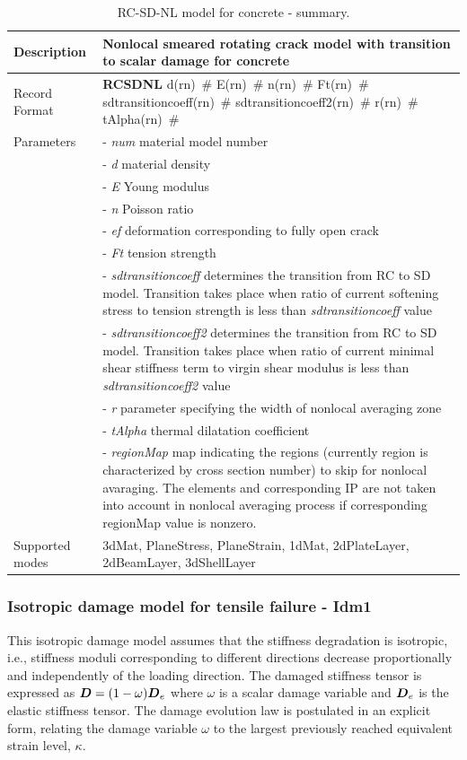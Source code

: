 \documentclass[a4paper]{article}
\newcommand{\mbf}[1]{\mbox{\boldmath$#1$}}
\newcommand{\descitem}[1]{{\noindent \bf #1}}
\newcommand{\elemparam}[2]{{{#1\tiny (#2)}~\#}}
\newcommand{\param}[1]{{\it #1}}
\begin{document}
\begin{table}[!htb]
\begin{tabular}{|l|p{9cm}|}
\hline
Description & Nonlocal smeared rotating crack model with transition to scalar damage for concrete\\
\hline
Record Format & \descitem{RCSDNL} \elemparam{d}{rn} \elemparam{E}{rn}
\elemparam{n}{rn}  \elemparam{Ft}{rn}
\elemparam{sdtransitioncoeff}{rn} \elemparam{sdtransitioncoeff2}{rn}
\elemparam{r}{rn} \elemparam{tAlpha}{rn} \\
Parameters &- \param{num} material model number\\
&- \param{d} material density\\
&- \param{E} Young modulus\\
&- \param{n} Poisson ratio\\
&- \param{ef} deformation corresponding to fully open crack\\
&- \param{Ft} tension strength\\
&- \param{sdtransitioncoeff} determines the transition from RC to SD
model. Transition takes place when ratio of current softening
stress to tension strength is less than  \param{sdtransitioncoeff} value\\
&- \param{sdtransitioncoeff2} determines the transition from RC to SD
model. Transition takes place when ratio of current minimal shear
stiffness term to virgin shear modulus is less than  \param{sdtransitioncoeff2} value\\
&- \param{r} parameter specifying the width of nonlocal averaging zone\\
&- \param{tAlpha} thermal dilatation coefficient\\
&- \param{regionMap} map indicating the regions (currently region is
characterized by cross section number) to skip for nonlocal
avaraging. The elements and corresponding IP are not taken into
account in nonlocal averaging process if corresponding regionMap
value is nonzero.\\
Supported modes& 3dMat, PlaneStress, PlaneStrain, 1dMat,
2dPlateLayer, 2dBeamLayer, 3dShellLayer\\
\hline
\end{tabular}
\caption{RC-SD-NL model for  concrete - summary.}
\label{rcsdnl_table}
\end{table}



\subsubsection{Isotropic damage model for tensile failure - Idm1}
\label{sec:idmtf}
This isotropic damage model assumes that the stiffness degradation is
isotropic, i.e., stiffness moduli corresponding to different
directions decrease proportionally and independently of the loading 
direction. The damaged stiffness tensor is expressed as
$\mbf{D}=(1-\omega)\mbf{D}_e$ where $\omega$ is a scalar damage variable
and $\mbf{D}_e$ is the elastic stiffness tensor.
The damage evolution law is postulated in an explicit form, relating
the damage variable $\omega$ to the largest previously reached 
equivalent strain level, $\kappa$.
\end{document}
